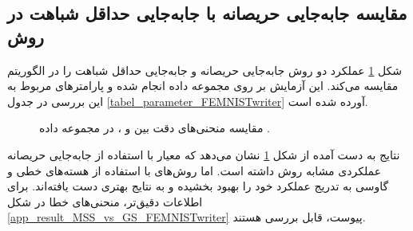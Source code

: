 \subsection{
	مقایسه جابه‌جایی حریصانه با جابه‌جایی حداقل شباهت در روش
}

شکل
\ref{result_MSS_vs_GS_FEMNISTwriter}
عملکرد دو روش جابه‌جایی حریصانه و جابه‌جایی حداقل شباهت را در الگوریتم
مقایسه می‌کند. این آزمایش بر روی مجموعه داده
انجام شده و پارامترهای مربوط به این بررسی در جدول
\ref{tabel_parameter_FEMNISTwriter}
آورده شده است.


\begin{figure}[t]
	\centering
	\hspace{0.8mm}
	\caption{
		مقایسه منحنی‌های دقت بین
		و
		، در مجموعه داده
		.
	}
	\label{result_MSS_vs_GS_FEMNISTwriter}
\end{figure}



نتایج به دست آمده از شکل
\ref{result_MSS_vs_GS_FEMNISTwriter}
نشان می‌دهد که معیار
با استفاده از جابه‌جایی حریصانه عملکردی مشابه روش
داشته است. اما روش‌های
با استفاده از هسته‌های خطی و گاوسی به تدریج عملکرد خود را بهبود بخشیده و به نتایج بهتری دست یافته‌اند. برای اطلاعات دقیق‌تر، منحنی‌های خطا در شکل
\ref{app_result_MSS_vs_GS_FEMNISTwriter}
پیوست، قابل بررسی هستند.




